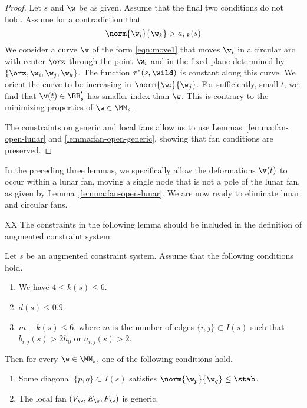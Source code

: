 \begin{proof} Let $s$ and $\w$ be as given.  Assume that the final
two conditions do not hold.
Assume for a contradiction that 
\[
\norm{\w_i}{\w_k}>a_{i,k}(s)
\]
We consider a curve $\v$ of the form \eqref{eqn:move1} that moves $\v_i$
in a circular arc with center $\orz$ through the point $\w_i$ and in
the fixed plane determined by $\{\orz,\w_i,\w_j,\w_{k}\}$.  
The function $\tau^*(s,\wild)$ is
constant along this curve.  We orient the curve to be increasing
in $\norm{\w_i}{\w_{j}}$.  For sufficiently, small $t$, we find that
$\v(t)\in\BB'_s$ has smaller index than $\w$.  This is contrary to the minimizing
properties of $\w\in\MM_s$.

The constraints on generic and local fans
allow us to use Lemmas~\ref{lemma:fan-open-lunar} and
\ref{lemma:fan-open-generic}, showing that fan conditions are preserved.
\end{proof}

In the preceding three lemmas, we specifically allow the deformations
$\v(t)$ to occur within a lunar fan, moving a single node that is not a pole
of the lunar fan, as given by Lemma~\ref{lemma:fan-open-lunar}.
We are now ready to eliminate  lunar and circular
fans.

XX The constraints in the following lemma 
should be included in the definition of augmented constraint system.

\begin{lemma} Let $s$ be an augmented constraint system.
Assume that the following conditions hold.  
\begin{enumerate}
\item We have $4 \le k(s) \le 6$.
\item $d(s) \le 0.9$.
\item  $m+k(s)\le 6$, where 
$m$ is the number of edges $\{i,j\}\subset I(s)$ such that
$b_{i,j}(s)> 2h_0$ or $a_{i,j}(s)>2$.  
\end{enumerate}
Then for every  $\w\in\MM_s$, one of the following conditions hold.
\begin{enumerate}
\item 
 Some diagonal $\{p,q\}\subset I(s)$ satisfies
$\norm{\w_p}{\w_q}\le \stab$.
\item The local fan $(V_\w,E_\w,F_\w)$ is generic.
\end{enumerate}
\end{lemma}

